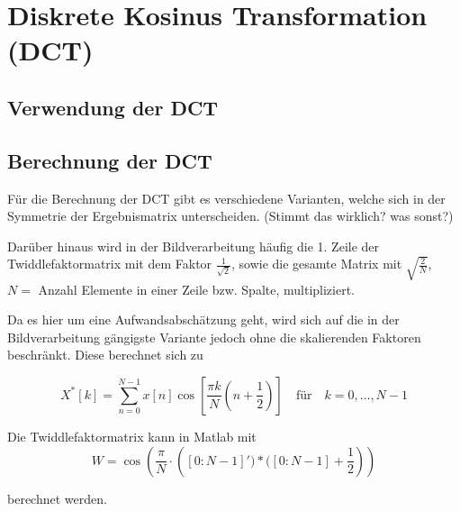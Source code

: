 \section{Diskrete Kosinus Transformation (DCT)}
\subsection{Verwendung der DCT}


\subsection{Berechnung der DCT}
Für die Berechnung der DCT gibt es verschiedene Varianten, welche sich in der Symmetrie der Ergebnismatrix unterscheiden. (Stimmt das wirklich? was sonst?)

Darüber hinaus wird in der Bildverarbeitung häufig die 1. Zeile der Twiddlefaktormatrix mit dem Faktor $\frac{1}{\sqrt2}$, sowie die gesamte Matrix mit 
$\sqrt{\frac{2}{N}}$, $N =$ Anzahl Elemente in einer Zeile bzw. Spalte, multipliziert.

Da es hier um eine Aufwandsabschätzung geht, wird sich auf die in der Bildverarbeitung gängigste Variante jedoch ohne die skalierenden Faktoren beschränkt.
Diese berechnet sich zu

\begin{equation}
X^*[k] = \sum_{n=0}^{N-1} x[n] \cos\left[\frac{\pi k}{N} \left(n+\frac{1}{2}\right) \right] \quad \textrm{für} \quad  k=0,\dots,N-1
\end{equation}

Die Twiddlefaktormatrix kann in Matlab mit
 \begin{equation}\label{eq:matlab_dct_faktoren}
  W = \cos\left(\frac{\pi}{N}\cdot \left([0:N-1]')*([0:N-1]+\frac{1}{2}\right)\right)
 \end{equation}

berechnet werden.